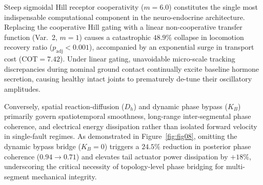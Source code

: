 \documentclass{iopjournal}
\begin{document}
\begin{table}[htbp]
\centering
\caption{5-Module Isolated Bio-Inspired Ablation Study (210 Episodes, Holm-Bonferroni adjusted relative to C5).}
\label{tab:ablation_summary}
\end{table}

Steep sigmoidal Hill receptor cooperativity ($m=6.0$) constitutes the single most indispensable computational component in the neuro-endocrine architecture. Replacing the cooperative Hill gating with a linear non-cooperative transfer function (Var.~2, $m=1$) causes a catastrophic $48.9\%$ collapse in locomotion recovery ratio ($p_{\text{adj}} < 0.001$), accompanied by an exponential surge in transport cost ($\text{COT} = 7.42$). Under linear gating, unavoidable micro-scale tracking discrepancies during nominal ground contact continually excite baseline hormone secretion, causing healthy intact joints to prematurely de-tune their oscillatory amplitudes.

Conversely, spatial reaction-diffusion ($D_h$) and dynamic phase bypass ($K_B$) primarily govern spatiotemporal smoothness, long-range inter-segmental phase coherence, and electrical energy dissipation rather than isolated forward velocity in single-fault regimes. As demonstrated in Figure~\ref{fig:fig08}, omitting the dynamic bypass bridge ($K_B=0$) triggers a $24.5\%$ reduction in posterior phase coherence ($0.94 \to 0.71$) and elevates tail actuator power dissipation by $+18\%$, underscoring the critical necessity of topology-level phase bridging for multi-segment mechanical integrity.
\end{document}

